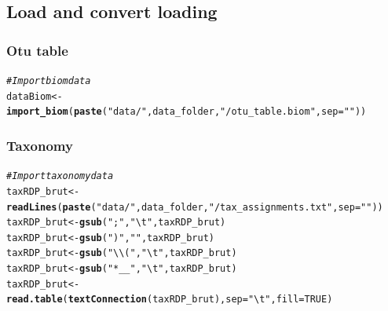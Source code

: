 \documentclass[12pt]{article}\usepackage[]{graphicx}\usepackage[]{color}
\makeatletter
\newcommand{\hlnum}[1]{\textcolor[rgb]{0.686,0.059,0.569}{#1}}%
\newcommand{\hlstr}[1]{\textcolor[rgb]{0.192,0.494,0.8}{#1}}%
\newcommand{\hlcom}[1]{\textcolor[rgb]{0.678,0.584,0.686}{\textit{#1}}}%
\newcommand{\hlstd}[1]{\textcolor[rgb]{0.345,0.345,0.345}{#1}}%
\newcommand{\hlkwb}[1]{\textcolor[rgb]{0.69,0.353,0.396}{#1}}%
\newcommand{\hlkwc}[1]{\textcolor[rgb]{0.333,0.667,0.333}{#1}}%
\newcommand{\hlkwd}[1]{\textcolor[rgb]{0.737,0.353,0.396}{\textbf{#1}}}%
\newenvironment{kframe}{%
 \def\at@end@of@kframe{}%
 \ifinner\ifhmode%
  \def\at@end@of@kframe{\end{minipage}}%
  \begin{minipage}{\columnwidth}%
 \fi\fi%
 \def\FrameCommand##1{\hskip\@totalleftmargin \hskip-\fboxsep
 \colorbox{shadecolor}{##1}\hskip-\fboxsep
     \hskip-\linewidth \hskip-\@totalleftmargin \hskip\columnwidth}%
 \MakeFramed {\advance\hsize-\width
   \@totalleftmargin\z@ \linewidth\hsize
   \@setminipage}}%
 {\par\unskip\endMakeFramed%
 \at@end@of@kframe}
\newenvironment{knitrout}{}{} %
\numberwithin{figure}{section}
\makeatother
\begin{document}
  \subsection{Load and convert loading}
  \subsubsection{Otu table}
\begin{knitrout}\small
{}\color{fgcolor}\begin{kframe}
\begin{alltt}
\hlcom{#Import biom data}
\hlstd{dataBiom}   \hlkwb{<-} \hlkwd{import_biom}\hlstd{(}\hlkwd{paste}\hlstd{(}\hlstr{"data/"}\hlstd{, data_folder,} \hlstr{"/otu_table.biom"}\hlstd{,} \hlkwc{sep}\hlstd{=}\hlstr{""}\hlstd{))}
\end{alltt}
\end{kframe}
\end{knitrout}

  \subsubsection{Taxonomy}
\begin{knitrout}\small
{}\color{fgcolor}\begin{kframe}
\begin{alltt}
\hlcom{#Import taxonomy data}
\hlstd{taxRDP_brut} \hlkwb{<-} \hlkwd{readLines}\hlstd{(}\hlkwd{paste}\hlstd{(}\hlstr{"data/"}\hlstd{, data_folder,} \hlstr{"/tax_assignments.txt"}\hlstd{,} \hlkwc{sep}\hlstd{=}\hlstr{""}\hlstd{))}
\hlstd{taxRDP_brut} \hlkwb{<-} \hlkwd{gsub}\hlstd{(}\hlstr{";"}\hlstd{,} \hlstr{"\textbackslash{}t"}\hlstd{, taxRDP_brut)}
\hlstd{taxRDP_brut} \hlkwb{<-} \hlkwd{gsub}\hlstd{(}\hlstr{")"}\hlstd{,} \hlstr{""}\hlstd{, taxRDP_brut)}
\hlstd{taxRDP_brut} \hlkwb{<-} \hlkwd{gsub}\hlstd{(}\hlstr{"\textbackslash{}\textbackslash{}("}\hlstd{,} \hlstr{"\textbackslash{}t"}\hlstd{, taxRDP_brut)}
\hlstd{taxRDP_brut} \hlkwb{<-} \hlkwd{gsub}\hlstd{(}\hlstr{"*__"}\hlstd{,} \hlstr{"\textbackslash{}t"}\hlstd{, taxRDP_brut)}
\hlstd{taxRDP_brut} \hlkwb{<-} \hlkwd{read.table}\hlstd{(}\hlkwd{textConnection}\hlstd{(taxRDP_brut),} \hlkwc{sep} \hlstd{=} \hlstr{"\textbackslash{}t"}\hlstd{,} \hlkwc{fill} \hlstd{=} \hlnum{TRUE}\hlstd{)}
\end{alltt}
\end{kframe}
\end{knitrout}
\end{document}
